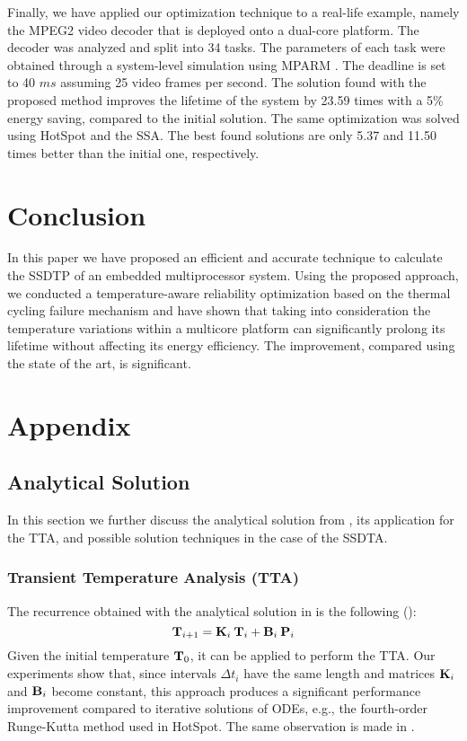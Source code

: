 Finally, we have applied our optimization technique to a real-life example,
namely the MPEG2 video decoder \cite{ffmpeg2011} that is deployed onto a
dual-core platform. The decoder was analyzed and split into 34 tasks. The
parameters of each task were obtained through a system-level simulation using
MPARM \cite{benini2005}. The deadline is set to 40 $ms$ assuming 25 video frames
per second. The solution found with the proposed method improves the lifetime of
the system by 23.59 times with a 5\% energy saving, compared to the initial
solution. The same optimization was solved using HotSpot and the SSA. The best
found solutions are only 5.37 and 11.50 times better than the initial one,
respectively.

\section{Conclusion}

In this paper we have proposed an efficient and accurate technique to calculate
the SSDTP of an embedded multiprocessor system. Using the proposed approach, we
conducted a temperature-aware reliability optimization based on the thermal
cycling failure mechanism and have shown that taking into consideration the
temperature variations within a multicore platform can significantly prolong its
lifetime without affecting its energy efficiency. The improvement, compared
using the state of the art, is significant.

\section{Appendix}

\subsection{Analytical Solution}

In this section we further discuss the analytical solution from
, its application for the TTA, and possible solution
techniques in the case of the SSDTA.

\subsubsection{Transient Temperature Analysis (TTA)} 

The recurrence obtained with the analytical solution in  is the
following ():
\[
  \mathbf{T}_{i+1} = \mathbf{K}_i \: \mathbf{T}_i + \mathbf{B}_i \: \mathbf{P}_i
\]
Given the initial temperature $\mathbf{T}_0$, it can be applied to perform the TTA.
Our experiments show that, since intervals $\Delta t_i$ have the same length and
matrices $\mathbf{K}_i$ and $\mathbf{B}_i$ become constant, this approach produces a
significant performance improvement compared to iterative solutions of ODEs,
e.g., the fourth-order Runge-Kutta method used in HotSpot. The same observation
is made in \cite{thiele2011}.

